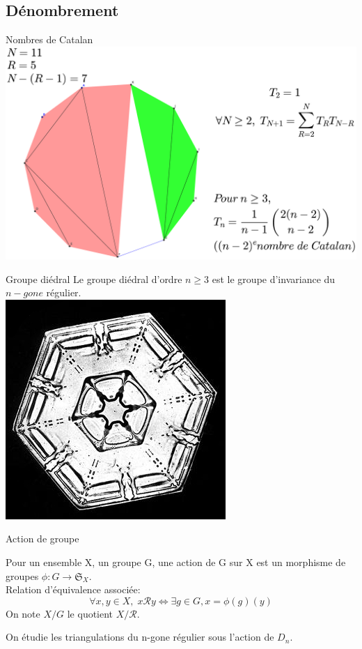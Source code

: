 \documentclass[french,xcolor=dvipsnames]{beamer}
\begin{document}
		\subsection{Dénombrement}
		\begin{frame}{Nombres de Catalan}
			\includegraphics[scale=0.15]{nombres_catalans.eps}
		\end{frame}
		\begin{frame}{Groupe diédral}
			Le groupe diédral d'ordre $n\geqslant 3$ est le groupe d'invariance du $n-gone$ régulier.\\
			\includegraphics[scale=0.22]{snowflake.jpg}
		\end{frame}
		
		\begin{frame}{Action de groupe}
			\begin{definition}
			Pour un ensemble X, un groupe G, une action de G sur X est un morphisme de groupes
			$\phi: G \rightarrow \mathfrak{S}_{X}$.\\
			Relation d'équivalence associée:
			\[
				\forall x,y \in X,\; x \mathcal{R} y \Leftrightarrow \exists g \in G, x=\phi(g)(y)
			\]
			On note $X/G$ le quotient $X/\mathcal{R}$.
			\end{definition}
			
			On étudie les triangulations du n-gone régulier sous l'action de $D_{n}$.
		\end{frame}
		
\end{document}
